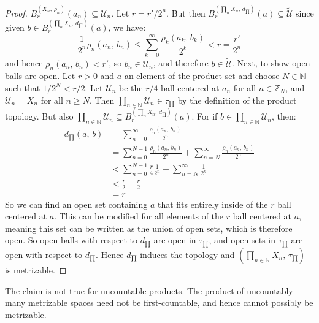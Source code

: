 \documentclass{article}
\theoremstyle{plain}
\theoremstyle{normal}
\begin{document}
\begin{proof}
            $B_{r}^{(X_{n},\,\rho_{n})}(a_{n})\subseteq\mathcal{U}_{n}$.
            Let $r=r'/2^{n}$. But then
            $B_{r}^{(\prod_{n}X_{n},\,d_{\prod})}(a)\subseteq\tilde{\mathcal{U}}$
            since given $b\in{B}_{r}^{(\prod_{n}X_{n},\,d_{\prod})}(a)$,
            we have:
            \begin{equation}
                \frac{1}{2^{n}}\rho_{n}(a_{n},\,b_{n})
                \leq\sum_{k=0}^{\infty}\frac{\rho_{k}(a_{k},\,b_{k})}{2^{k}}
                <r=\frac{r'}{2^{n}}
            \end{equation}
            and hence $\rho_{n}(a_{n},\,b_{n})<r'$, so
            $b_{n}\in\mathcal{U}_{n}$, and therefore $b\in\tilde{\mathcal{U}}$.
            Next, to show open balls are open. Let
            $r>0$ and $a$ an element of the product set and choose
            $N\in\mathbb{N}$ such that $1/2^{N}<r/2$. Let
            $\mathcal{U}_{n}$ be the $r/4$ ball centered at $a_{n}$ for all
            $n\in\mathbb{Z}_{N}$, and $\mathcal{U}_{n}=X_{n}$ for all
            $n\geq{N}$. Then
            $\prod_{n\in\mathbb{N}}\mathcal{U}_{n}\in\tau_{\prod}$ by the
            definition of the product topology. But also
            $\prod_{n\in\mathbb{N}}\mathcal{U}_{n}\subseteq{B}_{r}^{(\prod_{n}X_{n},\,d_{\prod})}(a)$.
            For if $b\in\prod_{n\in\mathbb{N}}\mathcal{U}_{n}$, then:
            \begin{align}
                d_{\prod}(a,\,b)
                &=\sum_{n=0}^{\infty}\frac{\rho_{n}(a_{n},\,b_{n})}{2^{n}}\\
                &=\sum_{n=0}^{N-1}\frac{\rho_{n}(a_{n},\,b_{n})}{2^{n}}
                    +\sum_{n=N}^{\infty}\frac{\rho_{n}(a_{n},\,b_{n})}{2^{n}}\\
                &<\sum_{n=0}^{N-1}\frac{r}{4}\frac{1}{2^{n}}
                +\sum_{n=N}^{\infty}\frac{1}{2^{n}}\\
                &<\frac{r}{2}+\frac{r}{2}\\
                &=r
            \end{align}
            So we can find an open set containing $a$ that fits entirely
            inside of the $r$ ball centered at $a$. This can be modified for
            all elements of the $r$ ball centered at $a$, meaning this set can
            be written as the union of open sets, which is therefore open.
            So open balls with respect to $d_{\prod}$ are open in
            $\tau_{\prod}$, and open sets in $\tau_{\prod}$ are open with
            respect to $d_{\prod}$. Hence $d_{\prod}$ induces the topology
            and $(\prod_{n\in\mathbb{N}}X_{n},\,\tau_{\prod})$ is
            metrizable.
        \end{proof}
        The claim is not true for uncountable products. The product of
        uncountably many metrizable spaces need not be first-countable, and
        hence cannot possibly be metrizable.
\end{document}
